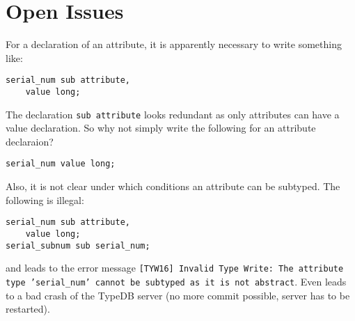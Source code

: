 \section{Open Issues}\label{sec:open_issues}

\begin{issue}\label{issue:decl_attribute}
For a declaration of an attribute, it is apparently necessary to write
something like:
\begin{verbatim}
serial_num sub attribute,
    value long;
\end{verbatim}
The declaration \texttt{sub attribute} looks redundant as only attributes can
have a value declaration. So why not simply write the following for an
attribute declaraion?
\begin{verbatim}
serial_num value long;
\end{verbatim}

Also, it is not clear under which conditions an attribute can be subtyped. The
  following is illegal:
  \begin{verbatim}
serial_num sub attribute,
    value long;
serial_subnum sub serial_num;
  \end{verbatim}
  
  and leads to the error message \texttt{[TYW16] Invalid Type Write: The
    attribute type 'serial\_num' cannot be subtyped as it is not abstract}.
  Even leads to a bad crash of the TypeDB server (no more commit possible,
  server has to be restarted). 
\end{issue}


